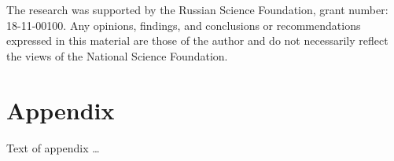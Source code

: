 \documentclass[sigplan,10pt,review]{acmart} %
\begin{document}








\begin{acks}                            %
 The research was supported by the Russian Science Foundation, grant number: 18-11-00100. Any opinions, findings, and
  conclusions or recommendations expressed in this material are those
  of the author and do not necessarily reflect the views of the
  National Science Foundation.
\end{acks}


%



\appendix
\section{Appendix}

Text of appendix \ldots
\end{document}
